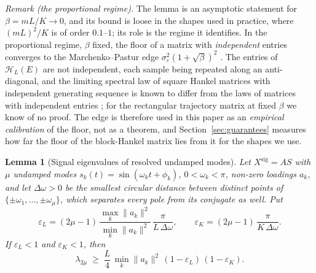 \documentclass{article}
\newtheorem{lemma}{\bf Lemma}
\begin{document}
\emph{Remark (the proportional regime).} The lemma is an asymptotic statement for $\beta = mL/K \to 0$, and its bound is loose in the shapes used in practice, where $(mL)^{2}/K$ is of order $0.1$--$1$; its role is the regime it identifies. In the proportional regime, $\beta$ fixed, the floor of a matrix with \emph{independent} entries converges to the Marchenko--Pastur edge $\sigma_\varepsilon^{2}(1 + \sqrt{\beta})^{2}$ \cite{ref-Yin, ref-BaiYin}. The entries of $\mathcal{H}_L(E)$ are not independent, each sample being repeated along an anti-diagonal, and the limiting spectral law of square Hankel matrices with independent generating sequence is known to differ from the laws of matrices with independent entries \cite{ref-Bryc}; for the rectangular trajectory matrix at fixed $\beta$ we know of no proof. The edge is therefore used in this paper as an \emph{empirical calibration} of the floor, not as a theorem, and Section~\ref{sec:guarantees} measures how far the floor of the block-Hankel matrix lies from it for the shapes we use.

\begin{lemma}[Signal eigenvalues of resolved undamped modes] \label{lem:signal}
Let $X^{\mathrm{sig}} = AS$ with $\mu$ undamped modes $s_k(t) = \sin(\omega_k t + \phi_k)$, $0 < \omega_k < \pi$, non-zero loadings $a_k$, and let $\Delta\omega > 0$ be the smallest circular distance between distinct points of $\{\pm\omega_1, \dots, \pm\omega_\mu\}$, which separates every pole from its conjugate as well. Put
\[
\varepsilon_L = (2\mu - 1)\,\frac{\max_k \lVert a_k \rVert^{2}}{\min_k \lVert a_k \rVert^{2}}\,\frac{\pi}{L\,\Delta\omega}, \qquad \varepsilon_K = (2\mu - 1)\,\frac{\pi}{K\,\Delta\omega} .
\]
If $\varepsilon_L < 1$ and $\varepsilon_K < 1$, then
\[
\lambda_{2\mu} \;\ge\; \frac{L}{4}\, \min_k \lVert a_k \rVert^{2}\,(1 - \varepsilon_L)\,(1 - \varepsilon_K) .
\]
\end{lemma}
\end{document}
